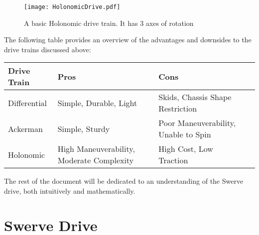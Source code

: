 \documentclass[a4paper]{article}
\begin{document}
\begin{figure}%
\begin{center}
\texttt{[image: HolonomicDrive.pdf]}
\end{center}
\caption{A basic Holonomic drive train. It has 3 axes of rotation}%
\label{HolDrive}%
\end{figure}
The following table provides an overview of the advantages and downsides to the drive trains discussed above: \newline \newline
\begin{tabular}{l*{3}{l}}
Drive Train				& Pros & Cons \\
\hline
Differential 		& Simple, Durable, Light 		& Skids, Chassis Shape Restriction \\
Ackerman 				& Simple, Sturdy 						& Poor Maneuverability, Unable to Spin \\
Holonomic 			& High Maneuverability, Moderate Complexity		& High Cost, Low Traction 
\end{tabular}
\newline \newline \newline
The rest of the document will be dedicated to an understanding of the Swerve drive, both intuitively and mathematically. 

\section{Swerve Drive}
\end{document}
